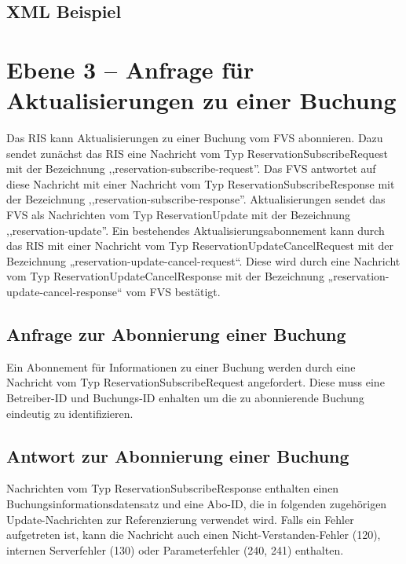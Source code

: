 

\subsection{XML Beispiel}

\section{Ebene 3 -- Anfrage für Aktualisierungen zu einer Buchung}

Das RIS kann Aktualisierungen zu einer Buchung vom FVS abonnieren. Dazu sendet zunächst das RIS eine Nachricht vom Typ ReservationSubscribeRequest mit der Bezeichnung ,,reservation-subscribe-request''. Das FVS antwortet auf diese Nachricht mit einer Nachricht vom Typ ReservationSubscribeResponse mit der Bezeichnung ,,reservation-subscribe-response''. Aktualisierungen sendet das FVS als Nachrichten vom Typ ReservationUpdate mit der Bezeichnung ,,reservation-update''. Ein bestehendes Aktualisierungsabonnement kann durch das RIS mit einer Nachricht vom Typ ReservationUpdateCancelRequest mit der Bezeichnung „reservation-update-cancel-request“. Diese wird durch eine Nachricht vom Typ ReservationUpdateCancelResponse mit der Bezeichnung „reservation-update-cancel-response“ vom FVS bestätigt.



\subsection{Anfrage zur Abonnierung einer Buchung}

Ein Abonnement für Informationen zu einer Buchung werden durch eine Nachricht vom Typ ReservationSubscribeRequest angefordert. Diese muss eine Betreiber-ID und Buchungs-ID enhalten um die zu abonnierende Buchung eindeutig zu identifizieren.



\subsection{Antwort zur Abonnierung einer Buchung}

Nachrichten vom Typ ReservationSubscribeResponse enthalten einen Buchungsinformationsdatensatz und eine Abo-ID, die in folgenden zugehörigen Update-Nachrichten zur Referenzierung verwendet wird. Falls ein Fehler aufgetreten ist, kann die Nachricht auch einen Nicht-Verstanden-Fehler (120), internen Serverfehler (130) oder Parameterfehler (240, 241) enthalten.

